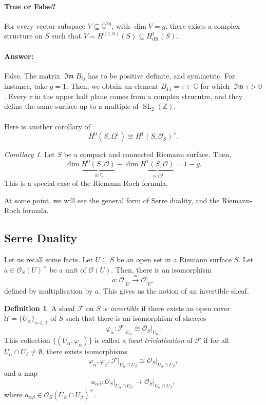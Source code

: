 \documentclass[a4paper]{report}
\theoremstyle{definition}
\newtheorem{definition}{Definition}
\theoremstyle{remark}
\theoremstyle{proposition}
\theoremstyle{conjecture}
\theoremstyle{lemma}
\theoremstyle{corollary}
\newtheorem{corollary}{Corollary}
\theoremstyle{exercise}
\theoremstyle{example}
\newcommand{\C}{\mathbb{C}}
\newcommand{\mcal}{\mathcal}
\newcommand{\on}{\operatorname}
\begin{document}
\paragraph{True or False?} For every vector subspace $V\subseteq \C^{2g}$,
with $\dim V = g$, there exists a complex structure on $S$ such that 
$V = H^{(1,0)}(S) \subseteq H^1_{\on{dR}}(S)$.
\paragraph{Answer:} False. The matrix $\on{\mathfrak{Im}}B_{ij}$ 
has to be positive definite, and symmetric. For instance, take $g=1$. 
Then, we obtain an element $B_{11}=\tau \in \C$ for which 
$\on{\mathfrak{Im}}\tau > 0$. Every $\tau$ in the upper half plane comes 
from a complex strucutre, and they define the same surface up to a multiple
of $\on{SL}_2(\mathbb{Z})$. \\\\
Here is another corollary of 
$$H^0(S,\Omega^1) \cong H^1(S,\mcal{O}_S)^\vee.$$

\begin{corollary}
    Let $S$ be a compact and connected Riemann surface. 
    Then, $$\dim \underbrace{H^0(S,\mcal{O})}_{\cong \C} - \dim \underbrace{H^1(S,\mcal{O})}_{\cong \C^g} = 1-g.$$
    This is a special case of the Riemann-Roch formula.
\end{corollary}

At some point, we will see the general form of Serre duality, and the 
Riemann-Roch formula.

\subsection{Serre Duality}

Let us recall some facts. Let $U\subseteq S$ be an open set in a Riemann
surface $S$. Let $a\in\mcal{O}_S(U)^\times$ be a unit of $\mcal{O}(U)$.
Then, there is an isomorphism
$$a : \mcal{O}\vert_U \stackrel{\simeq}{\longrightarrow} \mcal{O}\vert_U,$$
defined by multiplication by $a$. This gives us the notion of an invertible
sheaf. 
\begin{definition}
    A sheaf $\mcal{F}$ on $S$ is \emph{invertible} if there exists 
    an open cover $\mcal{U} = \lbrace U_\alpha\rbrace_{\alpha\in\Lambda}$ of $S$
    such that there is an isomorphism of sheaves
    $$\varphi_\alpha :\mcal{F}\vert_{U_\alpha} \cong \mcal{O}_S\vert_{U_\alpha}.$$
    This collection $\lbrace (U_\alpha,\varphi_\alpha)\rbrace$ is called a 
    \emph{local trivialisation} of $\mcal{F}$ if 
    for all $U_\alpha \cap U_\beta \neq \emptyset$, there exists 
    isomorphisms
    $$\varphi_\alpha,\varphi_\beta : \mcal{F}\vert_{U_\alpha \cap U_\beta} \cong \mcal{O}_S\vert_{U_\alpha\cap U_\beta},$$
    and a map 
    $$a_{\alpha\beta}: \mcal{O}_S\vert_{U_\alpha \cap U_\beta} \longrightarrow \mcal{O}_S\vert_{U_\alpha \cap U_\beta},$$
    where $a_{\alpha\beta} \in \mcal{O}_S(U_\alpha\cap U_\beta)^\times$.
\end{definition}
\end{document}
